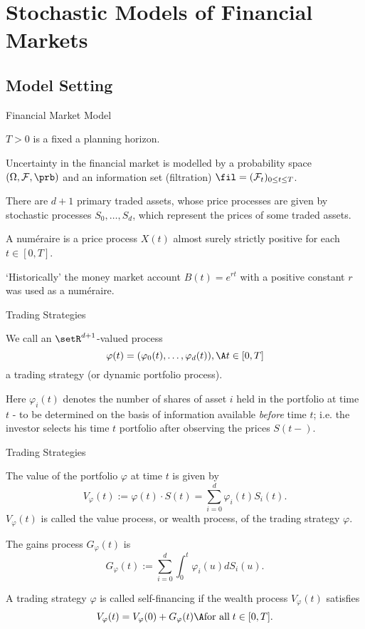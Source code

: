 \section{Stochastic Models of Financial Markets}
\subsection{Model Setting}

{ Financial Market Model}
\item<1->
$T>0$ is a fixed a planning horizon.
\item<2->
Uncertainty in the financial market is modelled by a probability
space $(\Omega, {\cal F},\prb)$ and an information set  (filtration) $\fil =({\cal
F}_t)_{0\leq t\leq T}$.
\item<3->
There are $d+1$ primary traded assets, whose price processes are
given by stochastic processes $S_0, \ldots, S_d$, which represent
the prices of some traded assets.
\item<4->
A num\'{e}raire is a price process $X(t)$ almost surely strictly
positive for each $t \in [0,T]$.
\item<5->
\lq {Historically}' the money market account $B(t)=e^{rt}$ with a
positive constant $r$ was used as a
num\'{e}raire.

{ Trading Strategies}

\item<1->  We call an $\setR^{d+1}$-valued process
$$
\varphi(t) = (\varphi_0(t), \ldots, \varphi_d(t)), \A t \in [0,T]
$$
a trading strategy (or dynamic portfolio process).
\item<2->
Here $\varphi_i(t)$ denotes the number of shares of asset $i$ held
in the portfolio at time $t$ - to be determined on the basis of
information available {\it before} time $t$; i.e. the investor
selects his time $t$ portfolio after observing the prices $S(t-)$.

{ Trading Strategies}
\item<1->  The value of the portfolio $\varphi$ at time $t$ is
given by
$$
V_\varphi(t) :=  \varphi(t) \cdot S(t) = \sum_{i=0}^d \varphi_i(t)
S_i(t).
$$
$V_\varphi(t)$ is called the value process, or wealth process, of
the trading strategy $\varphi$.\ \item<2-> The gains process
$G_\varphi(t)$ is
$$
G_\varphi(t) := \sum_{i=0}^d \int_0^t \varphi_i(u) dS_i(u).
$$
\item<3-> A trading strategy $\varphi$ is called self-financing if
the wealth process $V_\varphi(t)$ satisfies
$$
V_\varphi(t) = V_\varphi(0) + G_\varphi(t)\A \mbox{for all}\; t\in
[0,T].
$$

